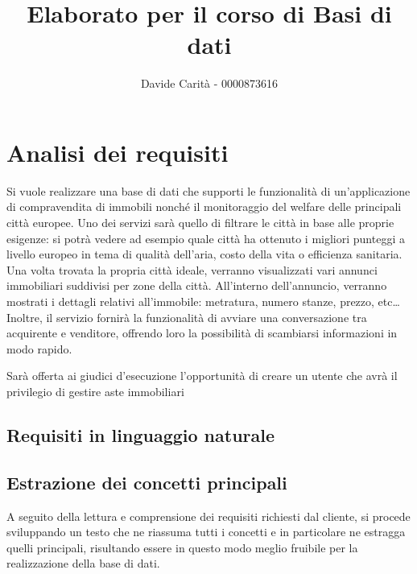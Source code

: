 \documentclass[a4paper,12pt]{report}
\begin{document}
    
	\title{Elaborato per il corso di Basi di dati}
	\author{Davide Carità - 0000873616}
	\date{}
	
    \maketitle
	\tableofcontents*
	\newpage


	\chapter*{Analisi dei requisiti}
    Si vuole realizzare una base di dati che supporti le funzionalità di 
    un'applicazione di compravendita di immobili nonché il monitoraggio del 
    welfare delle principali città europee. Uno dei servizi sarà quello di 
    filtrare le città in base alle proprie esigenze: si potrà vedere ad 
    esempio quale città ha ottenuto i migliori punteggi a livello europeo 
    in tema di qualità dell'aria, costo della vita o efficienza sanitaria. 
    Una volta trovata la propria città ideale, verranno visualizzati vari 
    annunci immobiliari suddivisi per zone della città. All'interno 
    dell'annuncio, verranno mostrati i dettagli relativi all'immobile: 
    metratura, numero stanze, prezzo, etc\dots
    Inoltre, il servizio fornirà la funzionalità di avviare una conversazione tra 
    acquirente e venditore, offrendo loro la possibilità di scambiarsi
    informazioni in modo rapido.

    Sarà offerta ai giudici d'esecuzione l'opportunità di creare un utente 
    che avrà il privilegio di gestire aste immobiliari

        \section*{Requisiti in linguaggio naturale}
    	






    	\section*{Estrazione dei concetti principali}
            A seguito della lettura e comprensione dei requisiti richiesti dal cliente, si procede sviluppando un testo che
            ne riassuma tutti i concetti e in particolare ne estragga quelli principali, risultando essere in questo modo
            meglio fruibile per la realizzazione della base di dati.
            
\end{document}
